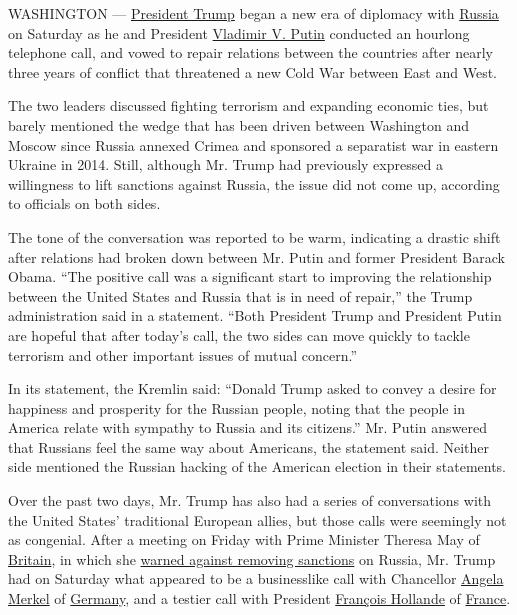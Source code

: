 WASHINGTON ---
\href{https://www.nytimes.com/topic/person/donald-trump}{President
Trump} began a new era of diplomacy with
\href{https://www.nytimes.com/topic/destination/russia?inline=nyt-geo}{Russia}
on Saturday as he and President
\href{https://www.nytimes.com/topic/person/vladimir-putin}{Vladimir V.
Putin} conducted an hourlong telephone call, and vowed to repair
relations between the countries after nearly three years of conflict
that threatened a new Cold War between East and West.

The two leaders discussed fighting terrorism and expanding economic
ties, but barely mentioned the wedge that has been driven between
Washington and Moscow since Russia annexed Crimea and sponsored a
separatist war in eastern Ukraine in 2014. Still, although Mr. Trump had
previously expressed a willingness to lift sanctions against Russia, the
issue did not come up, according to officials on both sides.

The tone of the conversation was reported to be warm, indicating a
drastic shift after relations had broken down between Mr. Putin and
former President Barack Obama. ``The positive call was a significant
start to improving the relationship between the United States and Russia
that is in need of repair,'' the Trump administration said in a
statement. ``Both President Trump and President Putin are hopeful that
after today's call, the two sides can move quickly to tackle terrorism
and other important issues of mutual concern.''

In its statement, the Kremlin said: ``Donald Trump asked to convey a
desire for happiness and prosperity for the Russian people, noting that
the people in America relate with sympathy to Russia and its citizens.''
Mr. Putin answered that Russians feel the same way about Americans, the
statement said. Neither side mentioned the Russian hacking of the
American election in their statements.

Over the past two days, Mr. Trump has also had a series of conversations
with the United States' traditional European allies, but those calls
were seemingly not as congenial. After a meeting on Friday with Prime
Minister Theresa May of
\href{https://www.nytimes.com/topic/destination/great-britain}{Britain},
in which she
\href{https://www.nytimes.com/2017/01/27/world/europe/theresa-may-britain-trump.html?_r=0}{warned
against removing sanctions} on Russia, Mr. Trump had on Saturday what
appeared to be a businesslike call with Chancellor
\href{https://www.nytimes.com/topic/person/angela-merkel}{Angela Merkel}
of
\href{https://www.nytimes.com/topic/destination/germany?inline=nyt-geo}{Germany},
and a testier call with President
\href{https://www.nytimes.com/topic/person/francois-hollande}{François
Hollande} of
\href{https://www.nytimes.com/topic/destination/france}{France}.

